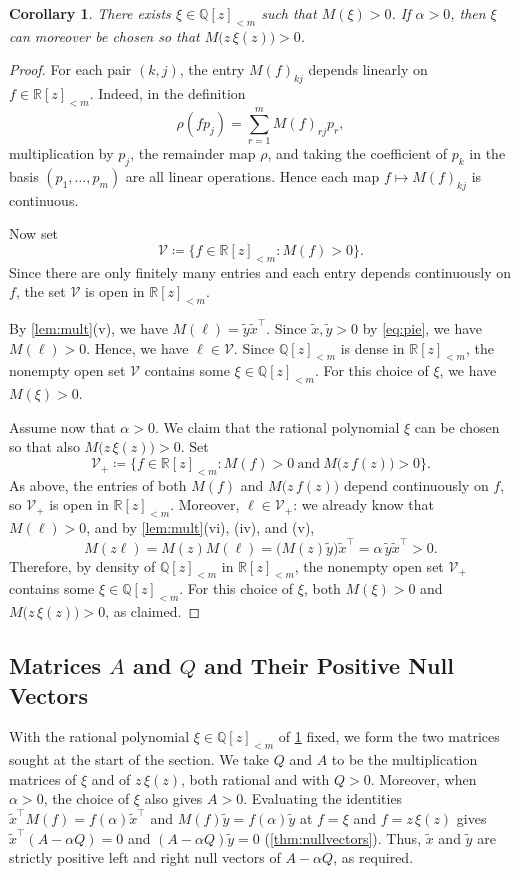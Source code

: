 \documentclass[11pt, a4paper]{article}
\theoremstyle{plain}
\newtheorem{corollary}{Corollary}
\theoremstyle{definition}
\newcommand{\Q}{\mathbb{Q}}
\newcommand{\R}{\mathbb{R}}
\newcommand{\PP}{\R[z]_{<m}}
\newcommand{\PQ}{\Q[z]_{<m}}
\newcommand{\defas}{\coloneqq}
\begin{document}
\begin{corollary}\label{prop:xi}
There exists $\xi\in\PQ$ such that $M(\xi)>0$. If $\alpha>0$, then $\xi$ can moreover be chosen so that $M\bigl(z\,\xi(z)\bigr)>0$.
\end{corollary}

\begin{proof}
For each pair $(k,j)$, the entry $M(f)_{kj}$ depends linearly on $f\in\PP$.
Indeed, in the definition
\[
\rho(fp_j)=\sum_{r=1}^mM(f)_{rj}p_r ,
\]
multiplication by $p_j$, the remainder map $\rho$, and taking the coefficient of $p_k$ in the basis $(p_1,\dots,p_m)$ are all linear operations.
Hence each map $f\mapsto M(f)_{kj}$ is continuous.

Now set
\[
\mathcal V\defas \{f\in\PP:M(f)>0\}.
\]
Since there are only finitely many entries and each entry depends continuously on $f$, the set $\mathcal V$ is open in $\PP$.

By \cref{lem:mult}(v), we have $M(\ell)=\tilde y\tilde x^{\top}$.
Since $\tilde x,\tilde y>0$ by \cref{eq:pie}, we have $M(\ell)>0$. Hence, we have $\ell\in\mathcal V$.
Since $\PQ$ is dense in $\PP$, the nonempty open set $\mathcal V$ contains some $\xi\in\PQ$.
For this choice of $\xi$, we have $M(\xi)>0$.

Assume now that $\alpha>0$. We claim that the rational polynomial $\xi$ can be chosen so that also $M\bigl(z\,\xi(z)\bigr)>0$.
Set
\[
\mathcal V_+\defas \{f\in\PP:M(f)>0\ \text{and}\ M\bigl(z\,f(z)\bigr)>0\}.
\]
As above, the entries of both $M(f)$ and $M\bigl(z\,f(z)\bigr)$ depend continuously on $f$, so $\mathcal V_+$ is open in $\PP$.
Moreover, $\ell\in\mathcal V_+$: we already know that $M(\ell)>0$, and by \cref{lem:mult}(vi), (iv), and (v),
\[
M(z\ell)=M(z)M(\ell)
=\bigl(M(z)\tilde y\bigr)\tilde x^{\top}
=\alpha\,\tilde y\tilde x^{\top}>0 .
\]
Therefore, by density of $\PQ$ in $\PP$, the nonempty open set $\mathcal V_+$ contains some $\xi\in\PQ$.
For this choice of $\xi$, both $M(\xi)>0$ and $M\bigl(z\,\xi(z)\bigr)>0$, as claimed.
\end{proof}

\subsection{\texorpdfstring{Matrices $A$ and $Q$ and Their Positive Null Vectors}{Matrices A and Q and Their Positive Null Vectors}}

With the rational polynomial $\xi\in\PQ$ of \cref{prop:xi} fixed, we form the two matrices sought at the start of the section.
We take $Q$ and $A$ to be the multiplication matrices of $\xi$ and of $z\,\xi(z)$, both rational and with $Q>0$. Moreover, when $\alpha>0$, the choice of $\xi$ also gives $A>0$.
Evaluating the identities $\tilde x^{\top}M(f)=f(\alpha)\tilde x^{\top}$ and $M(f)\tilde y=f(\alpha)\tilde y$ at $f=\xi$ and $f=z\,\xi(z)$ gives $\tilde x^{\top}(A-\alpha Q)=0$ and $(A-\alpha Q)\tilde y=0$ (\cref{thm:nullvectors}).
Thus, $\tilde x$ and $\tilde y$ are strictly positive left and right null vectors of $A-\alpha Q$, as required.
\end{document}
